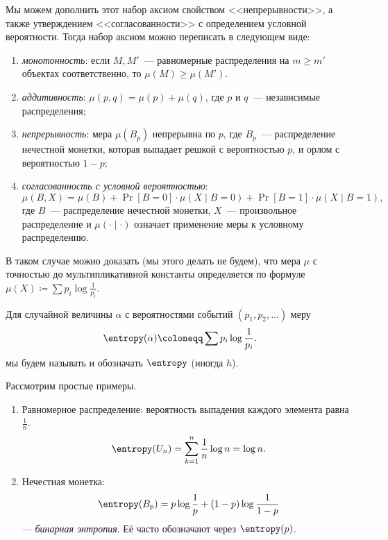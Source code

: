 Мы можем дополнить этот набор аксиом свойством <<непрерывности>>, а также утверждением
<<согласованности>> с определением условной вероятности. Тогда набор аксиом можно переписать в следующем
виде:
\begin{enumerate}
    \item \textit{монотонность}: если $M, M'$~--- равномерные распределения на $m \geq m'$ объектах
        соответственно, то $\mu(M) \geq \mu(M')$.
    \item \textit{аддитивность}: $\mu(p, q) = \mu(p) + \mu(q)$, где $p$ и $q$~--- независимые
        распределения;
    \item \textit{непрерывность}: мера $\mu(B_p)$ непрерывна по $p$, где $B_p$~--- распределение
        нечестной монетки, которая выпадает решкой с вероятностью $p$, и орлом с вероятностью $1 - p$;
    \item \textit{согласованность с условной вероятностью}:
        $$
            \mu(B, X) = \mu(B) + \Pr[B = 0] \cdot \mu(X \mid B = 0) + \Pr[B = 1] \cdot \mu(X \mid B = 1),
        $$
        где $B$~--- распределение нечестной монетки, $X$~--- произвольное распределение и $\mu(\cdot
        \mid \cdot)$ означает применение меры к условному распределению.
\end{enumerate}

В таком случае можно доказать (мы этого делать не будем), что мера $\mu$ с точностью до мультипликативной
константы определяется по формуле $\mu(X) \coloneqq \sum p_i \log \frac{1}{p_i}$.

\begin{definition}
    Для случайной величины $\alpha$ с вероятностями событий $(p_1, p_2, \dots)$ меру
    $$
        \entropy(\alpha) \coloneqq \sum p_i \log \frac{1}{p_i}.
    $$
    мы будем называть  и обозначать $\entropy$ (иногда $h$).
\end{definition}

Рассмотрим простые примеры.

\begin{enumerate}
    \item Равномерное распределение: вероятность выпадения каждого элемента равна $\frac{1}{n}$.
        $$
            \entropy(U_n) = \sum_{k = 1}^n \frac{1}{n} \log n = \log n.
        $$
    \item Нечестная монетка:
        $$
            \entropy(B_p) = p \log \frac{1}{p} + (1 - p) \log \frac{1}{1 - p}
        $$
        --- \textit{бинарная энтропия}. Её часто обозначают через $\entropy(p)$.
\end{enumerate}



